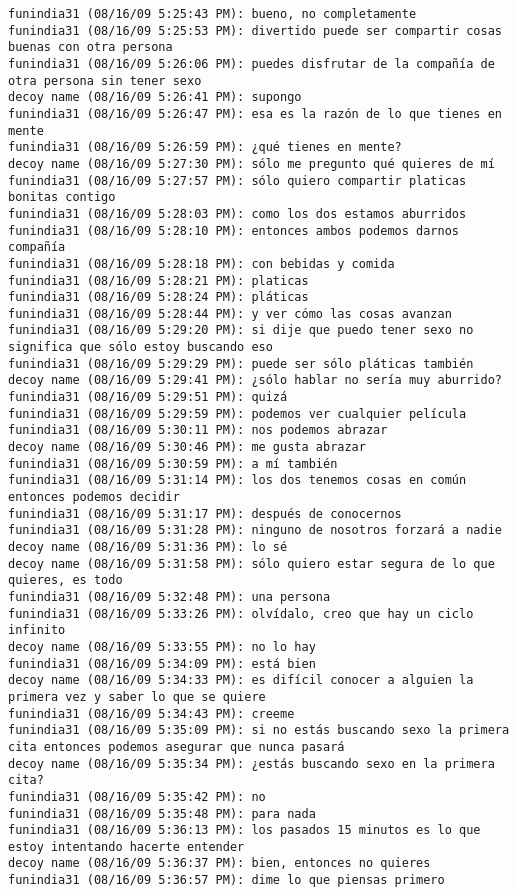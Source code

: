 \begin{verbatim}
funindia31 (08/16/09 5:25:43 PM): bueno, no completamente
funindia31 (08/16/09 5:25:53 PM): divertido puede ser compartir cosas buenas con otra persona
funindia31 (08/16/09 5:26:06 PM): puedes disfrutar de la compañía de otra persona sin tener sexo
decoy name (08/16/09 5:26:41 PM): supongo
funindia31 (08/16/09 5:26:47 PM): esa es la razón de lo que tienes en mente
funindia31 (08/16/09 5:26:59 PM): ¿qué tienes en mente?
decoy name (08/16/09 5:27:30 PM): sólo me pregunto qué quieres de mí
funindia31 (08/16/09 5:27:57 PM): sólo quiero compartir platicas bonitas contigo
funindia31 (08/16/09 5:28:03 PM): como los dos estamos aburridos
funindia31 (08/16/09 5:28:10 PM): entonces ambos podemos darnos compañía
funindia31 (08/16/09 5:28:18 PM): con bebidas y comida
funindia31 (08/16/09 5:28:21 PM): platicas
funindia31 (08/16/09 5:28:24 PM): pláticas
funindia31 (08/16/09 5:28:44 PM): y ver cómo las cosas avanzan
funindia31 (08/16/09 5:29:20 PM): si dije que puedo tener sexo no significa que sólo estoy buscando eso
funindia31 (08/16/09 5:29:29 PM): puede ser sólo pláticas también
decoy name (08/16/09 5:29:41 PM): ¿sólo hablar no sería muy aburrido?
funindia31 (08/16/09 5:29:51 PM): quizá
funindia31 (08/16/09 5:29:59 PM): podemos ver cualquier película
funindia31 (08/16/09 5:30:11 PM): nos podemos abrazar
decoy name (08/16/09 5:30:46 PM): me gusta abrazar
funindia31 (08/16/09 5:30:59 PM): a mí también
funindia31 (08/16/09 5:31:14 PM): los dos tenemos cosas en común entonces podemos decidir
funindia31 (08/16/09 5:31:17 PM): después de conocernos
funindia31 (08/16/09 5:31:28 PM): ninguno de nosotros forzará a nadie
decoy name (08/16/09 5:31:36 PM): lo sé
decoy name (08/16/09 5:31:58 PM): sólo quiero estar segura de lo que quieres, es todo
funindia31 (08/16/09 5:32:48 PM): una persona
funindia31 (08/16/09 5:33:26 PM): olvídalo, creo que hay un ciclo infinito
decoy name (08/16/09 5:33:55 PM): no lo hay
funindia31 (08/16/09 5:34:09 PM): está bien
decoy name (08/16/09 5:34:33 PM): es difícil conocer a alguien la primera vez y saber lo que se quiere
funindia31 (08/16/09 5:34:43 PM): creeme
funindia31 (08/16/09 5:35:09 PM): si no estás buscando sexo la primera cita entonces podemos asegurar que nunca pasará
decoy name (08/16/09 5:35:34 PM): ¿estás buscando sexo en la primera cita?
funindia31 (08/16/09 5:35:42 PM): no
funindia31 (08/16/09 5:35:48 PM): para nada
funindia31 (08/16/09 5:36:13 PM): los pasados 15 minutos es lo que estoy intentando hacerte entender
decoy name (08/16/09 5:36:37 PM): bien, entonces no quieres
funindia31 (08/16/09 5:36:57 PM): dime lo que piensas primero

\end{verbatim}
